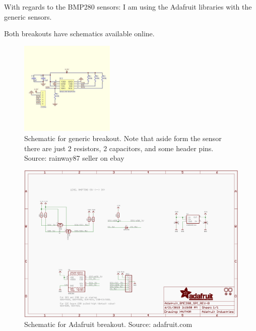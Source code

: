 \documentclass[preprint,12pt,3p]{elsarticle}
\begin{document}
With regards to the BMP280 sensors: I am using the Adafruit libraries with the
generic sensors.

Both breakouts have schematics available online.

\begin{figure}[H]
\centering
\includegraphics[width=0.4\textwidth]{images/sensor/generic_breakout_schematic.jpg}
\caption{Schematic for generic breakout. Note that aside form the sensor there
are just 2 resistors, 2 capacitors, and some header pins. Source: rainway87
seller on ebay}
\end{figure}


\begin{figure}
\centering
\includegraphics[width=\textwidth]{images/sensor/adafruit_breakout_schematic.png}
\caption{Schematic for Adafruit breakout. Source: adafruit.com}
\end{figure}

\end{document}
